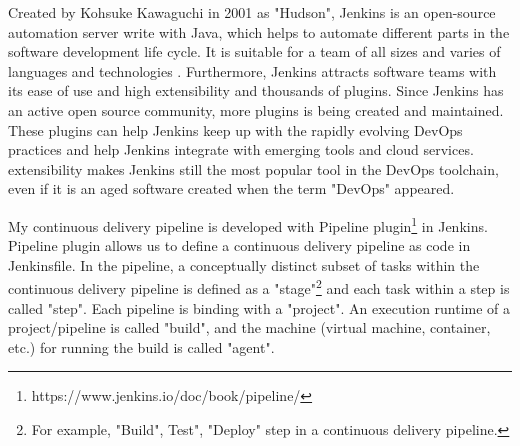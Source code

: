 \par
Created by Kohsuke Kawaguchi in 2001 as "Hudson", Jenkins is an open-source automation server write with Java, which helps to automate different parts in the software development life cycle.
It is suitable for a team of all sizes and varies of languages and technologies \cite{smart2011jenkins}. Furthermore, Jenkins attracts software teams with its ease of use and high extensibility \cite{smart2011jenkins} and thousands of plugins. Since Jenkins has an active open source community, more plugins is being created and maintained. These plugins can help Jenkins keep up with the rapidly evolving DevOps practices and help Jenkins integrate with emerging tools and cloud services. extensibility makes Jenkins still the most popular tool in the DevOps toolchain, even if it is an aged software created when the term "DevOps" appeared.
\par
My continuous delivery pipeline is developed with Pipeline plugin\footnote{https://www.jenkins.io/doc/book/pipeline/} in Jenkins.
Pipeline plugin allows us to define a continuous delivery pipeline as code in Jenkinsfile.
In the pipeline, a conceptually distinct subset of tasks within the continuous delivery pipeline \cite{Pipeline85:online} is defined as a "stage"\footnote{For example, "Build", Test", "Deploy" step in a continuous delivery pipeline.} and each task within a step is called "step". Each pipeline is binding with a "project". An execution runtime of a project/pipeline is called "build", and the machine (virtual machine, container, etc.) for running the build is called "agent".
